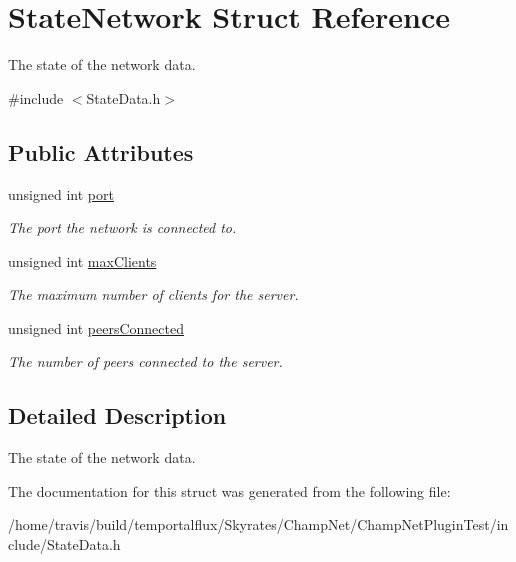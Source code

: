 \hypertarget{struct_state_network}{\section{State\-Network Struct Reference}
\label{struct_state_network}
}


The state of the network data.  




{\ttfamily \#include $<$State\-Data.\-h$>$}

\subsection*{Public Attributes}
\begin{DoxyCompactItemize}
\item 
\hypertarget{struct_state_network_a369a4768473db59ccbd4ba509a61595c}{unsigned int \hyperlink{struct_state_network_a369a4768473db59ccbd4ba509a61595c}{port}}\label{struct_state_network_a369a4768473db59ccbd4ba509a61595c}

\begin{DoxyCompactList}\small\item\em The port the network is connected to. \end{DoxyCompactList}\item 
\hypertarget{struct_state_network_a441e11a6962b2ef0f9456c937a1abbb6}{unsigned int \hyperlink{struct_state_network_a441e11a6962b2ef0f9456c937a1abbb6}{max\-Clients}}\label{struct_state_network_a441e11a6962b2ef0f9456c937a1abbb6}

\begin{DoxyCompactList}\small\item\em The maximum number of clients for the server. \end{DoxyCompactList}\item 
\hypertarget{struct_state_network_acad16df2ea00513fd70701fbfa90e329}{unsigned int \hyperlink{struct_state_network_acad16df2ea00513fd70701fbfa90e329}{peers\-Connected}}\label{struct_state_network_acad16df2ea00513fd70701fbfa90e329}

\begin{DoxyCompactList}\small\item\em The number of peers connected to the server. \end{DoxyCompactList}\end{DoxyCompactItemize}


\subsection{Detailed Description}
The state of the network data. 

The documentation for this struct was generated from the following file\-:\begin{DoxyCompactItemize}
\item 
/home/travis/build/temportalflux/\-Skyrates/\-Champ\-Net/\-Champ\-Net\-Plugin\-Test/include/State\-Data.\-h\end{DoxyCompactItemize}
